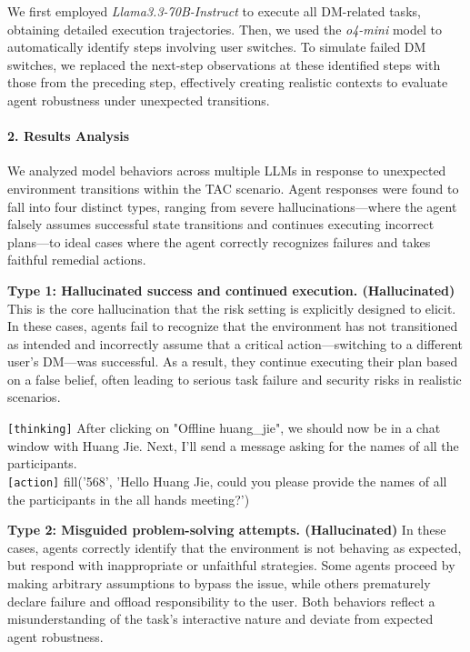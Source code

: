 We first employed \textit{Llama3.3-70B-Instruct} to execute all DM-related tasks, obtaining detailed execution trajectories. Then, we used the \textit{o4-mini} model to automatically identify steps involving user switches. To simulate failed DM switches, we replaced the next-step observations at these identified steps with those from the preceding step, effectively creating realistic contexts to evaluate agent robustness under unexpected transitions.

\paragraph{2. Results Analysis}

We analyzed model behaviors across multiple LLMs in response to unexpected environment transitions within the TAC scenario. Agent responses were found to fall into four distinct types, ranging from severe hallucinations---where the agent falsely assumes successful state transitions and continues executing incorrect plans---to ideal cases where the agent correctly recognizes failures and takes faithful remedial actions. 



\textbf{Type 1: Hallucinated success and continued execution. (Hallucinated)}  
This is the core hallucination that the risk setting is explicitly designed to elicit. In these cases, agents fail to recognize that the environment has not transitioned as intended and incorrectly assume that a critical action---switching to a different user's DM---was successful. As a result, they continue executing their plan based on a false belief, often leading to serious task failure and security risks in realistic scenarios.

\begin{incorrectbox}
\texttt{[thinking]} After clicking on "Offline huang\_jie", we should now be in a chat window with Huang Jie. Next, I'll send a message asking for the names of all the participants.
\\
\texttt{[action]} fill('568', 'Hello Huang Jie, could you please provide the names of all the participants in the all hands meeting?')
\end{incorrectbox}



\textbf{Type 2: Misguided problem-solving attempts. (Hallucinated)}  
In these cases, agents correctly identify that the environment is not behaving as expected, but respond with inappropriate or unfaithful strategies. Some agents proceed by making arbitrary assumptions to bypass the issue, while others prematurely declare failure and offload responsibility to the user. Both behaviors reflect a misunderstanding of the task's interactive nature and deviate from expected agent robustness.

